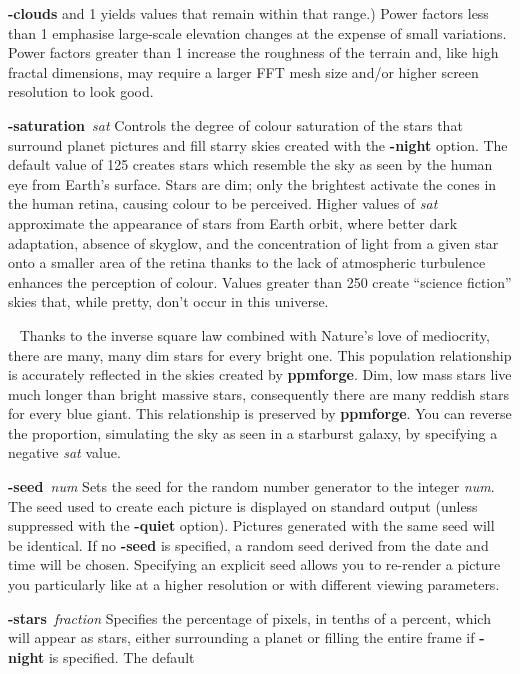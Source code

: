 \begin{TPlist}{{\bf -clouds}}
and 1 yields values that remain within that range.)  Power factors
less than 1 emphasise large-scale elevation changes at the expense of
small variations.  Power factors greater than 1 increase the roughness
of the terrain and, like high fractal dimensions, may require a larger
FFT mesh size and/or higher screen resolution to look good.
\item[{{\bf -saturation}{\it \ sat}
}]
Controls the degree of colour saturation of the stars that surround planet
pictures and fill starry skies created with the
{\bf -night}
option.  The default value of 125 creates stars which resemble the sky
as seen by the human eye from Earth's surface.  Stars are dim; only
the brightest activate the cones in the human retina, causing colour
to be perceived.  Higher values of
{\it sat}
approximate the appearance of stars from Earth orbit, where better
dark adaptation, absence of skyglow, and the concentration of light
from a given star onto a smaller area of the retina thanks to the lack
of atmospheric turbulence enhances the perception of colour.  Values
greater than 250 create ``science fiction'' skies that, while pretty,
don't occur in this universe.
\item[{\ }]
Thanks to the inverse square law combined with Nature's love of
mediocrity, there are many, many dim stars for every bright one.
This population relationship is accurately reflected in the skies
created by
{\bf ppmforge}{\rm .}
Dim, low mass stars live much longer than bright massive stars,
consequently there are many reddish stars for every blue giant.  This
relationship is preserved by
{\bf ppmforge}{\rm .}
You can reverse the proportion, simulating the sky as seen in a starburst
galaxy, by specifying a negative
{\it sat}
value.
\item[{{\bf -seed}{\it \ num}
}]
Sets the seed for the random number generator to the integer
{\it num}{\rm .}
The seed used to create each picture is displayed on standard output (unless
suppressed with the
{\bf -quiet}
option).  Pictures generated with the same seed will be identical.  If no
{\bf -seed}
is specified, a random seed derived from the date and time will be
chosen.  Specifying an explicit seed allows you to re-render a picture
you particularly like at a higher resolution or with different viewing
parameters.
\item[{{\bf -stars}{\it \ fraction}
}]
Specifies the percentage of pixels, in tenths of a percent, which will
appear as stars, either surrounding a planet or filling the entire
frame if
{\bf -night}
is specified.  The default

\end{TPlist}
